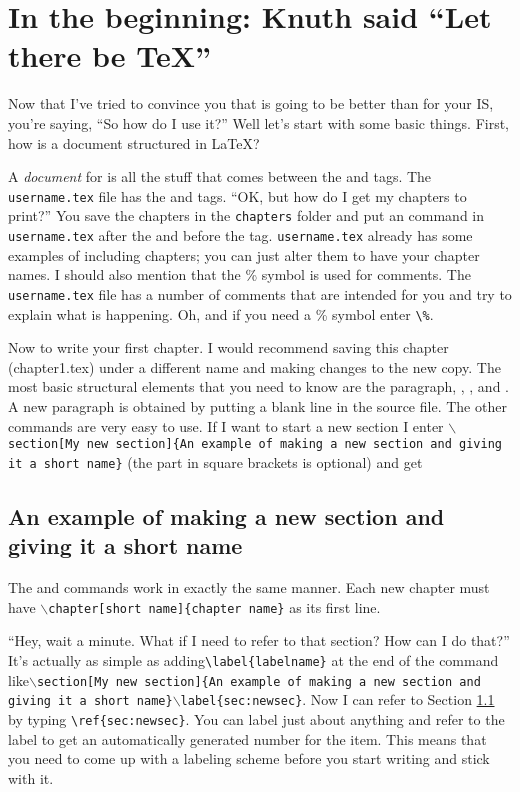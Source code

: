 \chapter{In the beginning: Knuth said ``Let there be \TeX''}\label{text}
Now that I've tried to convince you that \lt is going to be better than \msw for your IS, you're saying, ``So how do I use it?'' Well let's start with some basic things. First, how is a document structured in \LaTeX?

A \emph{document} for \lt is all the stuff that comes between the \verb|| and \verb|| tags. The\verb| username.tex| file has the \verb|| and \verb|| tags. ``OK, but how do I get my chapters to print?'' You save the chapters in the \verb|chapters| folder and put an \verb|| command in \verb|username.tex| after the \verb|| and before the
\verb|| tag. \verb|username.tex| already has some examples of including chapters; you can just alter them to have your chapter names. I should also mention that the \% symbol is used for comments. The \verb|username.tex| file has a number of comments that are intended for you and try to explain what is happening. Oh, and if you need a \% symbol enter \verb+\%+.

Now to write your first chapter. I would recommend saving this chapter (chapter1.tex) under a different name and making changes to the new copy. The most basic structural elements that you need to know are the paragraph, , , and . A new paragraph is obtained by putting a blank line in the source file.  The other commands are very easy to use. If I want to start a new section I enter \texttt{$\backslash$section[My new section]\{An example of making a new section and giving it a short name\}} (the part in square brackets is optional) and get

\section[My new section]{An example of making a new section and giving it a short name}\label{sec:newsec}

The  and  commands work in exactly the same manner. Each new chapter must have \texttt{$\backslash$chapter[short name]\{chapter name\}} as its first line.

``Hey, wait a minute. What if I need to refer to that section? How can I do that?'' It's actually as simple as adding\verb+\label{labelname}+ at the end of the  command like\texttt{$\backslash$section[My new section]\{An example of making a new section and giving it a short name\}$\backslash$label\{sec:newsec\}}. Now I can refer to Section \ref{sec:newsec} by typing \verb+\ref{sec:newsec}+. You can label just about anything and refer to the label to get an automatically generated number for the item. This means that you need to come up with a labeling scheme before you start writing and stick with it.

